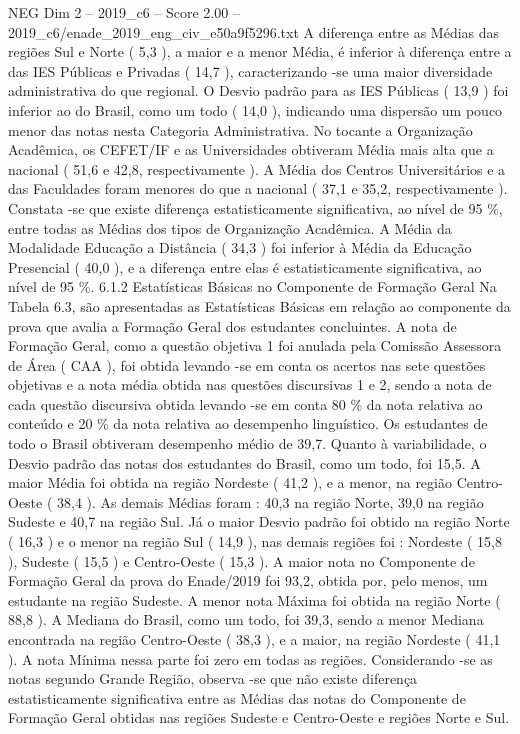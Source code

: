 \begin{textsample}{NEG Dim 2 – 2019\_c6 – Score 2.00 – 2019\_c6/enade\_2019\_eng\_civ\_e50a9f5296.txt}
A diferença entre as Médias das regiões Sul e Norte ( 5,3 ), a maior e a menor Média, é inferior à diferença entre a das IES Públicas e Privadas ( 14,7 ), caracterizando -se uma maior diversidade administrativa do que regional.
O Desvio padrão para as IES Públicas ( 13,9 ) foi inferior ao do Brasil, como um todo ( 14,0 ), indicando uma dispersão um pouco menor das notas nesta Categoria Administrativa.
No tocante a Organização Acadêmica, os CEFET/IF e as Universidades obtiveram Média mais alta que a nacional ( 51,6 e 42,8, respectivamente ).
A Média dos Centros Universitários e a das Faculdades foram menores do que a nacional ( 37,1 e 35,2, respectivamente ).
Constata -se que existe diferença estatisticamente significativa, ao nível de 95 \%, entre todas as Médias dos tipos de Organização Acadêmica.
A Média da Modalidade Educação a Distância ( 34,3 ) foi inferior à Média da Educação Presencial ( 40,0 ), e a diferença entre elas é estatisticamente significativa, ao nível de 95 \%. 6.1.2 Estatísticas Básicas no Componente de Formação Geral Na Tabela 6.3, são apresentadas as Estatísticas Básicas em relação ao componente da prova que avalia a Formação Geral dos estudantes concluintes.
A nota de Formação Geral, como a questão objetiva 1 foi anulada pela Comissão Assessora de Área ( CAA ), foi obtida levando -se em conta os acertos nas sete questões objetivas e a nota média obtida nas questões discursivas 1 e 2, sendo a nota de cada questão discursiva obtida levando -se em conta 80 \% da nota relativa ao conteúdo e 20 \% da nota relativa ao desempenho linguístico.
Os estudantes de todo o Brasil obtiveram desempenho médio de 39,7.
Quanto à variabilidade, o Desvio padrão das notas dos estudantes do Brasil, como um todo, foi 15,5.
A maior Média foi obtida na região Nordeste ( 41,2 ), e a menor, na região Centro-Oeste ( 38,4 ).
As demais Médias foram : 40,3 na região Norte, 39,0 na região Sudeste e 40,7 na região Sul.
Já o maior Desvio padrão foi obtido na região Norte ( 16,3 ) e o menor na região Sul ( 14,9 ), nas demais regiões foi : Nordeste ( 15,8 ), Sudeste ( 15,5 ) e Centro-Oeste ( 15,3 ).
A maior nota no Componente de Formação Geral da prova do Enade/2019 foi 93,2, obtida por, pelo menos, um estudante na região Sudeste.
A menor nota Máxima foi obtida na região Norte ( 88,8 ).
A Mediana do Brasil, como um todo, foi 39,3, sendo a menor Mediana encontrada na região Centro-Oeste ( 38,3 ), e a maior, na região Nordeste ( 41,1 ).
A nota Mínima nessa parte foi zero em todas as regiões.
Considerando -se as notas segundo Grande Região, observa -se que não existe diferença estatisticamente significativa entre as Médias das notas do Componente de Formação Geral obtidas nas regiões Sudeste e Centro-Oeste e regiões Norte e Sul.

\end{textsample}
